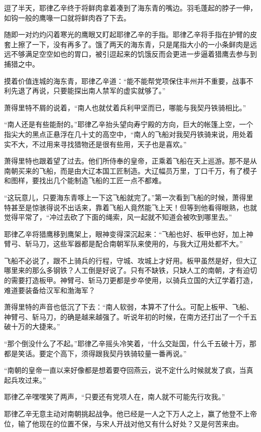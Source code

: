 逗了半天，耶律乙辛终于将鲜肉拿着凑到了海东青的嘴边。羽毛蓬起的脖子一伸，如钩一般的鹰喙一口就将鲜肉吞了下去。

随即一对灼灼闪着寒光的鹰眼又盯起耶律乙辛的手指。耶律乙辛将手指在护臂的皮套上擦了一下，没有再多了。饿了两天的海东青，只是尾指大小的一小条鲜肉是远远不够满足空空如也的胃口，被引逗起来的饥饿反而会更进一步逼着猎鹰去参与到捕猎之中。

摸着价值连城的海东青，耶律乙辛道：“能不能帮党项保住丰州并不重要，战事不利先退了再说，只要能探出南人禁军的虚实就够了。”

萧得里特不屑的说着，“南人也就仗着兵利甲坚而已，哪能与我契丹铁骑相比。”

“南人还是有些能耐的。”耶律乙辛抬头望向寿宁殿的方向，巨大的帐篷上空，一个指尖大的黑点正悬浮在几十丈的高空中，“南人的飞船对我契丹铁骑来说，用处着实不大，不过用来寻找猎物还是很有些用，天子也是喜欢。”

萧得里特也跟着望了过去。他们所侍奉的皇帝，正乘着飞船在天上巡游。那不是从南朝买来的飞船，而是由大辽本国工匠制造。大辽幅员万里，丁口千万，有了模子和图样，要找出几个能制造飞船的工匠一点不都难。

“这玩意儿，只要海东青啄上一下这飞船就完了。”第一次看到飞船的时候，萧得里特甚至是惊骇得说不出话来，靠着飞船人竟然能飞上天！但等到他看得眼熟，也就觉得平常了，“冲过去砍了下面的绳索，风一起就不知道会被吹到哪里去。”

耶律乙辛将猎鹰移到鹰架上，眼神变得深沉起来：“飞船也好、板甲也好，加上神臂弓、斩马刀，这些军器都是配合南朝军队来使用的，与我大辽用处都不大。”

飞船不必说了，跟不上骑兵的行程，守城、攻城上才好用。板甲虽然是好，但大辽哪里来的那么多钢铁？人工倒是好说了。只有不缺铁，只缺人工的南朝，才有迫切的需要打造板甲。神臂弓、斩马刀更都是步卒使用，以骑兵立国的大辽学着打造，难道要装备给汉军和渤海军？

萧得里特的声音也低沉了下去：“南人软弱，本算不了什么。可配上板甲、飞船、神臂弓、斩马刀，的确是越来越强了。听说年初的时候，在南方还打出了一个千五破十万的大捷来。”

“那个倒没什么了不起。”耶律乙辛摇头冷笑着，“什么交趾国，什么千五破十万，那都是笑话。要定个高下，须得跟我契丹铁骑较量一番再说。”

“南朝的皇帝一直以来好像都是想着要夺回燕云，说不定什么时候就发了疯，当真起兵攻过来。”

耶律乙辛嘿嘿笑了两声，“只要还有党项人在，南人就不可能先行攻我。”

耶律乙辛无意主动对南朝挑起战争。他已经是一人之下万人之上，赢了他登不上帝位，输了他现在的位置不保，与宋人开战对他又有什么好处？又是何苦来由。

